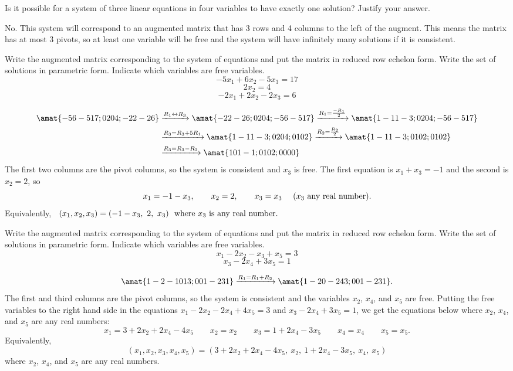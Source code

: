 \begin{problems}
\problem   %
Is it possible for a system of three linear equations in four
variables to have exactly one solution?  Justify your answer.

\begin{solution}
  No.  This system will correspond to an augmented matrix that has 3
  rows and 4 columns to the left of the augment.  This means the
  matrix has at most 3 pivots, so at least one variable will be free
  and the system will have infinitely many solutions if it is
  consistent.
\end{solution}


\problem Write the augmented matrix corresponding to the system of
equations and put the matrix in reduced row echelon form.  Write the
set of solutions in parametric form.  Indicate which variables are
free variables.
  \[-5x_1 + 6x_2 - 5x_3 = 17\]
  \[2x_2 = 4\]
  \[-2x_1 + 2x_2 - 2x_3 = 6\]

\begin{solution}
  \begin{align*}
    \amat{-5 6 -5 17; 0 2 0 4; -2 2 -2 6}
    & 
      \xrightarrow[]{R_1 \leftrightarrow R_3}
      \amat{-2 2 -2 6; 0 2 0 4; -5 6 -5 17}
      \xrightarrow[]{R_1 = \frac{-R_1}{2}}
      \amat{1 -1 1 -3; 0 2 0 4; -5 6 -5 17}
    \\
    &
      \xrightarrow[]{R_3= R_3 + 5R_1} \amat{1 -1 1 -3; 0 2 0 4; 0 1 0 2}
      \xrightarrow[]{R_2 = \frac{R_2}{2}} \amat{1 -1 1 -3; 0 1 0 2; 0 1 0 2}
    \\
    &
      \xrightarrow[]{R_3 = R_3 - R_2}
      \amat{1 0 1 -1; 0 1 0 2; 0 0 0 0} 
  \end{align*}
  The first two columns are the pivot columns, so the system is
  consistent and $x_3$ is free.  The first equation is
  $x_1 + x_3 = -1$ and the second is $x_2 = 2$, so
  \[x_1 = -1-x_3, \qquad x_2 = 2, \qquad x_3 = x_3 \quad \textup{
      ($x_3$ any real number)}.\] Equivalently, \
  $(x_1, x_2, x_3) = (-1 - x_3, \ 2, \ x_3) \ \textup{ where
    $x_3$ is any real number}.$
\end{solution}

\problem %
Write the augmented matrix corresponding to the system of
equations and put the matrix in reduced row echelon form.  Write the
set of solutions in parametric form.  Indicate which variables are
free variables.
\[x_1 - 2x_2 -x_3 + x_5 = 3\]
  \[x_3 - 2x_4 + 3x_5 = 1\]
\begin{solution}
\[
  \amat{1 -2 -1 0 1 3; 0 0 1 -2 3 1} \xrightarrow[]{R_1 = R_1+R_2}
  \amat{1 -2 0 -2 4 3; 0 0 1 -2 3 1}.\]
%
The first and third columns are the pivot columns, so the system is
consistent and the variables $x_2$, $x_4$, and $x_5$ are free.
Putting the free variables to the right hand side in the equations
$x_1 - 2x_2 - 2x_4 + 4x_5 = 3$ and $x_3-2x_4+3x_5 = 1$, we get the
equations below where $x_2$, $x_4$, and $x_5$ are any real numbers:
\[
  x_1 = 3 + 2x_2 + 2x_4 -4x_5 \qquad x_2 = x_2 \qquad x_3 = 1 + 2x_4 -
  3x_5 \qquad x_4 = x_4 \qquad x_5 = x_5.
\]
Equivalently,
\[(x_1, x_2, x_3, x_4, x_5) = (3 + 2x_2 + 2x_4 -4x_5, \ x_2, \ 1 +
  2x_4 - 3x_5, \ x_4, \ x_5)\] where $x_2$, $x_4$, and $x_5$ are any
real numbers.
\end{solution}


\end{problems}

